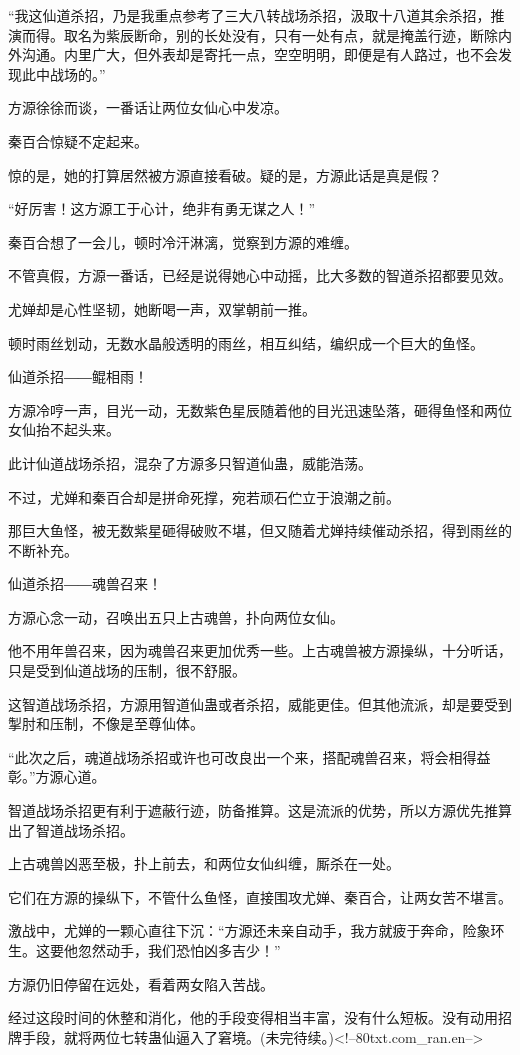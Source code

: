 \begin{this_body}
“我这仙道杀招，乃是我重点参考了三大八转战场杀招，汲取十八道其余杀招，推演而得。取名为紫辰断命，别的长处没有，只有一处有点，就是掩盖行迹，断除内外沟通。内里广大，但外表却是寄托一点，空空明明，即便是有人路过，也不会发现此中战场的。”

方源徐徐而谈，一番话让两位女仙心中发凉。

秦百合惊疑不定起来。

惊的是，她的打算居然被方源直接看破。疑的是，方源此话是真是假？

“好厉害！这方源工于心计，绝非有勇无谋之人！”

秦百合想了一会儿，顿时冷汗淋漓，觉察到方源的难缠。

不管真假，方源一番话，已经是说得她心中动摇，比大多数的智道杀招都要见效。

尤婵却是心性坚韧，她断喝一声，双掌朝前一推。

顿时雨丝划动，无数水晶般透明的雨丝，相互纠结，编织成一个巨大的鱼怪。

仙道杀招――鲲相雨！

方源冷哼一声，目光一动，无数紫色星辰随着他的目光迅速坠落，砸得鱼怪和两位女仙抬不起头来。

此计仙道战场杀招，混杂了方源多只智道仙蛊，威能浩荡。

不过，尤婵和秦百合却是拼命死撑，宛若顽石伫立于浪潮之前。

那巨大鱼怪，被无数紫星砸得破败不堪，但又随着尤婵持续催动杀招，得到雨丝的不断补充。

仙道杀招――魂兽召来！

方源心念一动，召唤出五只上古魂兽，扑向两位女仙。

他不用年兽召来，因为魂兽召来更加优秀一些。上古魂兽被方源操纵，十分听话，只是受到仙道战场的压制，很不舒服。

这智道战场杀招，方源用智道仙蛊或者杀招，威能更佳。但其他流派，却是要受到掣肘和压制，不像是至尊仙体。

“此次之后，魂道战场杀招或许也可改良出一个来，搭配魂兽召来，将会相得益彰。”方源心道。

智道战场杀招更有利于遮蔽行迹，防备推算。这是流派的优势，所以方源优先推算出了智道战场杀招。

上古魂兽凶恶至极，扑上前去，和两位女仙纠缠，厮杀在一处。

它们在方源的操纵下，不管什么鱼怪，直接围攻尤婵、秦百合，让两女苦不堪言。

激战中，尤婵的一颗心直往下沉：“方源还未亲自动手，我方就疲于奔命，险象环生。这要他忽然动手，我们恐怕凶多吉少！”

方源仍旧停留在远处，看着两女陷入苦战。

经过这段时间的休整和消化，他的手段变得相当丰富，没有什么短板。没有动用招牌手段，就将两位七转蛊仙逼入了窘境。(未完待续。)<!--80txt.com\_ran.en-->

\end{this_body}

